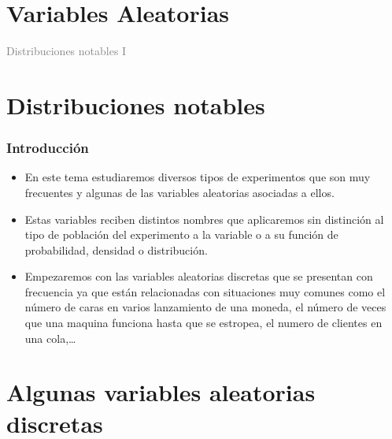 \documentclass[handout]{beamer}\usepackage[]{graphicx}\usepackage[]{color}
\title[\red{Matemáticas III GINF}]{}
\author[]{R. Alberich}
\date{}
\newcommand{\gray}[1]{\textcolor{gray}{#1}}
\theoremstyle{plain}
\theoremstyle{definition}
\begin{document}
\beamertemplatedotitem

\lstset{breaklines=true}
\lstset{basicstyle=\ttfamily}


\section{Variables Aleatorias}

\begin{frame}
\vfill
\begin{center}
\gray{\LARGE Distribuciones notables I }
\end{center}
\vfill
\end{frame}
\section{Distribuciones notables}

\begin{frame}
\frametitle{Introducción}
\begin{itemize}
\item En este tema estudiaremos diversos tipos de experimentos que son muy frecuentes y algunas de las variables aleatorias asociadas a ellos. 

\item Estas variables reciben distintos nombres
que aplicaremos sin distinción al tipo de población del experimento a la variable o a su
función de probabilidad, densidad o distribución.
\item Empezaremos con las variables aleatorias discretas que se presentan con frecuencia ya que están
relacionadas con situaciones muy comunes como el número de caras en varios lanzamiento de
una moneda, el número de veces que una maquina funciona hasta que se estropea, el numero de
clientes en una cola,\ldots
\end{itemize}

\end{frame}

\section{Algunas variables aleatorias discretas}
\end{document}
